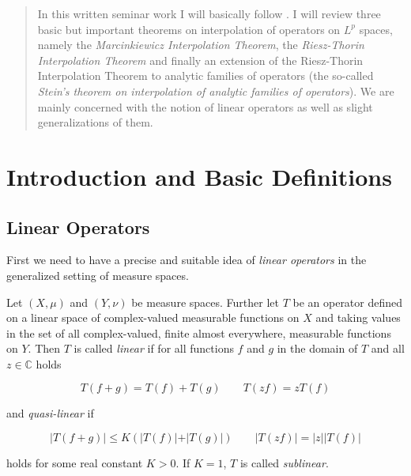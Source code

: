 


\begin{abstract}
	In this written seminar work I will basically follow \cite[33--48]{grafakos:fourier:2014}. I will review three basic but important theorems on interpolation of operators on $L^p$ spaces, namely the \emph{Marcinkiewicz Interpolation Theorem}, the \emph{Riesz-Thorin Interpolation Theorem} and finally an extension of the Riesz-Thorin Interpolation Theorem to analytic families of operators (the so-called \emph{Stein's theorem on interpolation of analytic families of operators}). We are mainly concerned with the notion of linear operators as well as slight generalizations of them. 
\end{abstract}

\maketitle

\tableofcontents

\mainsectionstyle

\section{Introduction and Basic Definitions}
\subsection{Linear Operators}
First we need to have a precise and suitable idea of \emph{linear operators} in the generalized setting of measure spaces.
\vspace{2mm}
\begin{mdframed}
	\begin{definition}
		Let $(X,\mu)$ and $(Y,\nu)$ be measure spaces. Further let $T$ be an operator defined on a linear space of complex-valued measurable functions on $X$ and taking values in the set of all complex-valued, finite almost everywhere, measurable functions on $Y$. Then $T$ is called \emph{linear} if for all functions $f$ and $g$ in the domain of $T$ and all $z \in \mathbb{C}$ holds

		\begin{equation}
			T\left( f + g \right) = T(f) + T(g) \qquad T\left( zf \right) = zT(f)
			\label{eq:linear}
		\end{equation}

		and \emph{quasi-linear} if

		\begin{equation}
			\vert T\left( f + g \right) \vert \leqslant K \left( \vert T(f)\vert + \vert T(g)\vert \right) \qquad \vert T(zf) \vert = \vert z\vert \vert T(f)\vert
			\label{eq:quasilinear}
		\end{equation}

		holds for some real constant $K > 0$. If $K = 1$, $T$ is called \emph{sublinear}.
	\end{definition}
\end{mdframed}





\originalsectionstyle

\appendix

\printbibliography

\printindex

